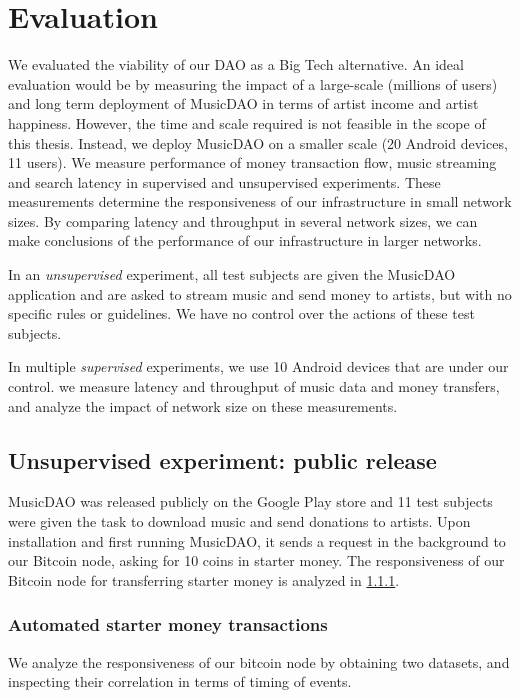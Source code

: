 \chapter{\label{chap:evaluation}Evaluation}
We evaluated the viability of our DAO as a Big Tech alternative. An ideal evaluation would be by measuring the impact of a large-scale (millions of users) and long term deployment of MusicDAO in terms of artist income and artist happiness. However, the time and scale required is not feasible in the scope of this thesis. Instead, we deploy MusicDAO on a smaller scale (20 Android devices, 11 users). We measure performance of money transaction flow, music streaming and search latency in supervised and unsupervised experiments. These measurements determine the responsiveness of our infrastructure in small network sizes. By comparing latency and throughput in several network sizes, we can make conclusions of the performance of our infrastructure in larger networks.

In an \textit{unsupervised} experiment, all test subjects are given the MusicDAO application and are asked to stream music and send money to artists, but with no specific rules or guidelines. We have no control over the actions of these test subjects.

In multiple \textit{supervised} experiments, we use 10 Android devices that are under our control. we measure latency and throughput of music data and money transfers, and analyze the impact of network size on these measurements.


\section{Unsupervised experiment: public release}
MusicDAO was released publicly on the Google Play store and 11 test subjects were given the task to download music and send donations to artists. Upon installation and first running MusicDAO, it sends a request in the background to our Bitcoin node, asking for 10 coins in starter money. The responsiveness of our Bitcoin node for transferring starter money is analyzed in \ref{chap:starter-money-flow}.

\subsection{Automated starter money transactions}
\label{chap:starter-money-flow}
We analyze the responsiveness of our bitcoin node by obtaining two datasets, and inspecting their correlation in terms of timing of events.

